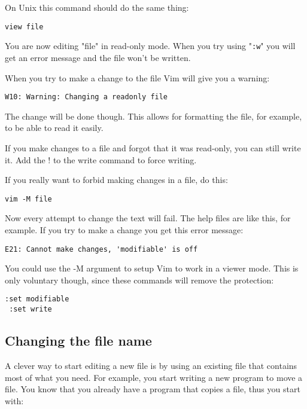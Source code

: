 On Unix this command should do the same thing:

 \begin{Verbatim}[samepage=true]
 view file
 \end{Verbatim}

You are now editing "file" in read-only mode.
When you try using "\texttt{:w}" you will get an error message and the file won't be written.

When you try to make a change to the file Vim will give you a warning:

\begin{Verbatim}[samepage=true]
    W10: Warning: Changing a readonly file 
\end{Verbatim}

The change will be done though.
This allows for formatting the file, for example, to be able to read it easily.

If you make changes to a file and forgot that it was read-only, you can still write it.
Add the ! to the write command to force writing.

If you really want to forbid making changes in a file, do this:

 \begin{Verbatim}[samepage=true]
 vim -M file
 \end{Verbatim}

Now every attempt to change the text will fail.
The help files are like this, for example.
If you try to make a change you get this error message:

\begin{Verbatim}[samepage=true]
    E21: Cannot make changes, 'modifiable' is off 
\end{Verbatim}

You could use the -M argument to setup Vim to work in a viewer mode.
This is only voluntary though, since these commands will remove the protection:

 \begin{Verbatim}[samepage=true]
 :set modifiable
 :set write
 \end{Verbatim}

\subsection{Changing the file name}
A clever way to start editing a new file is by using an existing file that contains most of what you need.
For example, you start writing a new program to move a file.
You know that you already have a program that copies a file, thus you start with:

